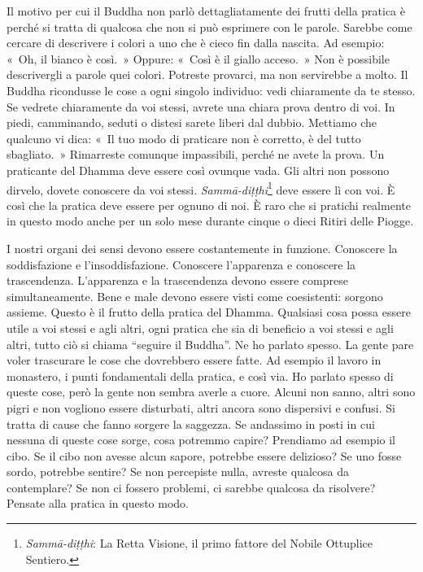 Il motivo per cui il Buddha non parlò dettagliatamente dei frutti della
pratica è perché si tratta di qualcosa che non si può esprimere con le
parole. Sarebbe come cercare di descrivere i colori a uno che è cieco
fin dalla nascita. Ad esempio: «~Oh, il bianco è così.~» Oppure: «~Così
è il giallo acceso.~» Non è possibile descrivergli a parole quei colori.
Potreste provarci, ma non servirebbe a molto. Il Buddha ricondusse le
cose a ogni singolo individuo: vedi chiaramente da te stesso. Se vedrete
chiaramente da voi stessi, avrete una chiara prova dentro di voi. In
piedi, camminando, seduti o distesi sarete liberi dal dubbio. Mettiamo
che qualcuno vi dica: «~Il tuo modo di praticare non è corretto, è del
tutto sbagliato.~» Rimarreste comunque impassibili, perché ne avete la
prova. Un praticante del Dhamma deve essere così ovunque vada. Gli altri
non possono dirvelo, dovete conoscere da voi stessi.
\emph{Sammā-diṭṭhi}\footnote{\emph{Sammā-diṭṭhi}: La Retta Visione, il
  primo fattore del Nobile Ottuplice Sentiero.} deve essere lì con voi.
È così che la pratica deve essere per ognuno di noi. È raro che si
pratichi realmente in questo modo anche per un solo mese durante cinque
o dieci Ritiri delle Piogge.

I nostri organi dei sensi devono essere costantemente in funzione.
Conoscere la soddisfazione e l'insoddisfazione. Conoscere l'apparenza e
conoscere la trascendenza. L'apparenza e la trascendenza devono essere
comprese simultaneamente. Bene e male devono essere visti come
coesistenti: sorgono assieme. Questo è il frutto della pratica del
Dhamma. Qualsiasi cosa possa essere utile a voi stessi e agli altri,
ogni pratica che sia di beneficio a voi stessi e agli altri, tutto ciò
si chiama ``seguire il Buddha''. Ne ho parlato spesso. La gente pare
voler trascurare le cose che dovrebbero essere fatte. Ad esempio il
lavoro in monastero, i punti fondamentali della pratica, e così via. Ho
parlato spesso di queste cose, però la gente non sembra averle a cuore.
Alcuni non sanno, altri sono pigri e non vogliono essere disturbati,
altri ancora sono dispersivi e confusi. Si tratta di cause che fanno
sorgere la saggezza. Se andassimo in posti in cui nessuna di queste cose
sorge, cosa potremmo capire? Prendiamo ad esempio il cibo. Se il cibo
non avesse alcun sapore, potrebbe essere delizioso? Se uno fosse sordo,
potrebbe sentire? Se non percepiste nulla, avreste qualcosa da
contemplare? Se non ci fossero problemi, ci sarebbe qualcosa da
risolvere? Pensate alla pratica in questo modo.

